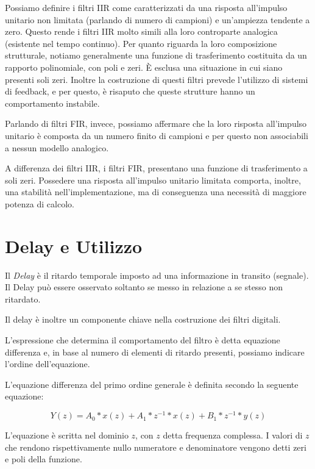 Possiamo definire i filtri IIR come caratterizzati da una risposta all’impulso
unitario non limitata (parlando di numero di campioni) e un’ampiezza tendente
a zero. Questo rende i filtri IIR molto simili alla loro controparte analogica
(esistente nel tempo continuo). Per quanto riguarda la loro composizione
strutturale, notiamo generalmente una funzione di trasferimento costituita da
un rapporto polinomiale, con poli e zeri. È esclusa una situazione in cui siano
presenti soli zeri. Inoltre la costruzione di questi filtri prevede l’utilizzo
di sistemi di feedback, e per questo, è risaputo che queste strutture hanno un
comportamento instabile.

Parlando di filtri FIR, invece, possiamo affermare che la loro risposta
all’impulso unitario è composta da un numero finito di campioni e per questo
non associabili a nessun modello analogico.

A differenza dei filtri IIR, i filtri FIR, presentano una funzione di
trasferimento a soli zeri. Possedere una risposta all’impulso unitario limitata
comporta, inoltre, una stabilità nell'implementazione, ma di conseguenza una
necessità di maggiore potenza di calcolo.


\section{Delay e Utilizzo}

Il \emph{Delay} è il ritardo temporale imposto ad una informazione in transito
(segnale). Il Delay può essere osservato soltanto se messo in relazione a se
stesso non ritardato.

Il delay è inoltre un componente chiave nella costruzione dei filtri digitali.

L’espressione che determina il comportamento del filtro è detta equazione
differenza e, in base al numero di elementi di ritardo presenti, possiamo
indicare l’ordine dell’equazione.

L’equazione differenza del primo ordine generale è definita secondo la seguente
equazione:

\begin{equation}
Y(z)=A_0*x(z) + A_1*z^{-1}*x(z) + B_1*z^{-1}*y(z)
\end{equation}

L’equazione è scritta nel dominio $z$, con $z$ detta frequenza complessa.
I valori di $z$ che rendono rispettivamente nullo numeratore e denominatore
vengono detti zeri e poli della funzione.

